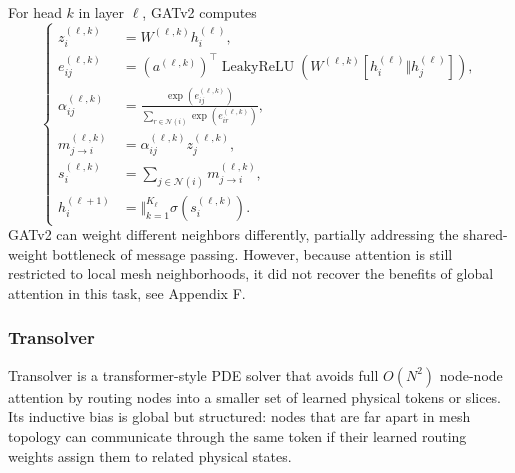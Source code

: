 \documentclass[11pt,a4paper,reqno]{amsart}
\theoremstyle{definition}
\theoremstyle{remark}
\numberwithin{equation}{section}
\begin{document}
For head $k$ in layer $\ell$, GATv2 computes
\begin{equation}
\left\{
\begin{aligned}
    z_i^{(\ell,k)} &= W^{(\ell,k)}h_i^{(\ell)},\\
    e_{ij}^{(\ell,k)}&=(a^{(\ell,k)})^\top
    \operatorname{LeakyReLU}\left(W^{(\ell,k)}[h_i^{(\ell)}\Vert h_j^{(\ell)}]\right),\\
    \alpha_{ij}^{(\ell,k)}&=\frac{\exp(e_{ij}^{(\ell,k)})}{\sum_{r\in\mathcal N(i)}\exp(e_{ir}^{(\ell,k)})},\\
    m_{j\to i}^{(\ell,k)}&=\alpha_{ij}^{(\ell,k)}z_j^{(\ell,k)},\\
    s_i^{(\ell,k)}&=\sum_{j\in\mathcal N(i)}m_{j\to i}^{(\ell,k)},\\
    h_i^{(\ell+1)}&=\big\Vert_{k=1}^{K_\ell}\sigma(s_i^{(\ell,k)}).
\end{aligned}
\right.
\label{eq:gatv2}
\end{equation}
GATv2 can weight different neighbors differently, partially addressing the shared-weight bottleneck of message passing. However, because attention is still restricted to local mesh neighborhoods, it did not recover the benefits of global attention in this task, see Appendix F.

\subsubsection{Transolver}

Transolver is a transformer-style PDE solver that avoids full $O(N^2)$ node-node attention by routing nodes into a smaller set of learned physical tokens or slices. Its inductive bias is global but structured: nodes that are far apart in mesh topology can communicate through the same token if their learned routing weights assign them to related physical states.
\end{document}

